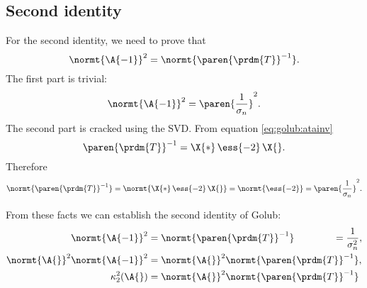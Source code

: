 \subsection{Second identity}
For the second identity, we need to prove that
\begin{equation}
  \normt{\A{-1}}^{2} = \normt{\paren{\prdm{T}}^{-1}}.
\end{equation}
The first part is trivial:
\begin{equation}
  \normt{\A{-1}}^{2} = \paren{\frac{1}{\sigma_{n}}}^{2}.
\end{equation}
The second part is cracked using the SVD. From equation \eqref{eq:golub:atainv}
\begin{equation}
  \paren{\prdm{T}}^{-1} = \X{*}\,\ess{-2}\,\X{}.
\end{equation}
Therefore
\begin{equation}
  \normt{ \paren{\prdm{T}}^{-1} } = \normt{ \X{*}\,\ess{-2}\,\X{} } = \normt{ \ess{-2} } = \paren{\frac{1}{\sigma_{n}}}^{2}.
\end{equation}

From these facts we can establish the second identity of Golub:
\begin{equation}
  \begin{split}
     \normt{\A{-1}}^{2}   &= \normt{ \paren{\prdm{T}}^{-1} } \qquad \qquad = \frac{1}{\sigma^{2}_{n}}, \\
     \normt{\A{}}^{2}\normt{\A{-1}}^{2} &= \normt{\A{}}^{2}\normt{ \paren{\prdm{T}}^{-1} }, \\
     \kappa_{2}^{2}(\A{}) &= \normt{\A{}}^{2} \normt{\paren{\prdm{T}}^{-1}}
  \end{split}
\end{equation}
\endinput